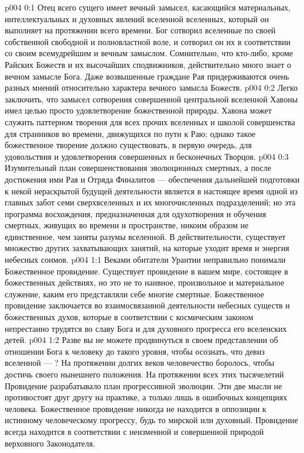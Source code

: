 \vs p004 0:1 Отец всего сущего имеет вечный замысел, касающийся материальных, интеллектуальных и духовных явлений вселенной вселенных, который он выполняет на протяжении всего времени. Бог сотворил вселенные по своей собственной свободной и полновластной воле, и сотворил он их в соответствии со своим всемудрейшим и вечным замыслом. Сомнительно, что кто\hyp{}либо, кроме Райских Божеств и их высочайших сподвижников, действительно много знает о вечном замысле Бога. Даже возвышенные граждане Рая придерживаются очень разных мнений относительно характера вечного замысла Божеств.
\vs p004 0:2 Легко заключить, что замысел сотворения совершенной центральной вселенной Хавоны имел целью просто удовлетворение божественной природы. Хавона может служить паттерном творения для всех прочих вселенных и школой совершенства для странников во времени, движущихся по пути к Раю; однако такое божественное творение должно существовать, в первую очередь, для удовольствия и удовлетворения совершенных и бесконечных Творцов.
\vs p004 0:3 Изумительный план совершенствования эволюционных смертных, а после достижения ими Рая и Отряда Финалитов --- обеспечения дальнейшей подготовки к некой нераскрытой будущей деятельности является в настоящее время одной из главных забот семи сверхвселенных и их многочисленных подразделений; но эта программа восхождения, предназначенная для одухотворения и обучения смертных, живущих во времени и пространстве, никоим образом не единственное, чем заняты разумы вселенной. В действительности, существует множество других захватывающих занятий, на которые уходит время и энергия небесных сонмов.
\vs p004 1:1 Веками обитатели Урантии неправильно понимали Божественное провидение. Существует провидение в вашем мире, состоящее в божественных действиях, но это не то наивное, произвольное и материальное служение, каким его представляли себе многие смертные. Божественное провидение заключается во взаимосвязанной деятельности небесных существ и божественных духов, которые в соответствии с космическим законом непрестанно трудятся во славу Бога и для духовного прогресса его вселенских детей.
\vs p004 1:2 Разве вы не можете продвинуться в своем представлении об отношении Бога к человеку до такого уровня, чтобы осознать, что девиз вселенной ---  ? На протяжении долгих веков человечество боролось, чтобы достичь своего нынешнего положения. На протяжении всех этих тысячелетий Провидение разрабатывало план прогрессивной эволюции. Эти две мысли не противостоят друг другу на практике, а только лишь в ошибочных концепциях человека. Божественное провидение никогда не находится в оппозиции к истинному человеческому прогрессу, будь то мирской или духовный. Провидение всегда находится в соответствии с неизменной и совершенной природой верховного Законодателя.
